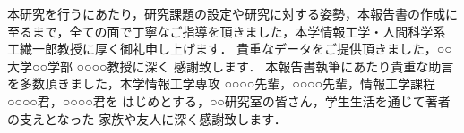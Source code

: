 \documentclass[main]{subfiles}
\begin{document}
\acknowledgement %
本研究を行うにあたり，研究課題の設定や研究に対する姿勢，本報告書の作成に
至るまで，全ての面で丁寧なご指導を頂きました，本学情報工学・人間科学系 
工繊一郎教授に厚く御礼申し上げます．
貴重なデータをご提供頂きました，○○大学○○学部 ○○○○教授に深く
感謝致します．
本報告書執筆にあたり貴重な助言を多数頂きました，本学情報工学専攻
 ○○○○先輩，○○○○先輩，情報工学課程 ○○○○君，○○○○君を
はじめとする，○○研究室の皆さん，学生生活を通じて著者の支えとなった
家族や友人に深く感謝致します．

\end{document}
